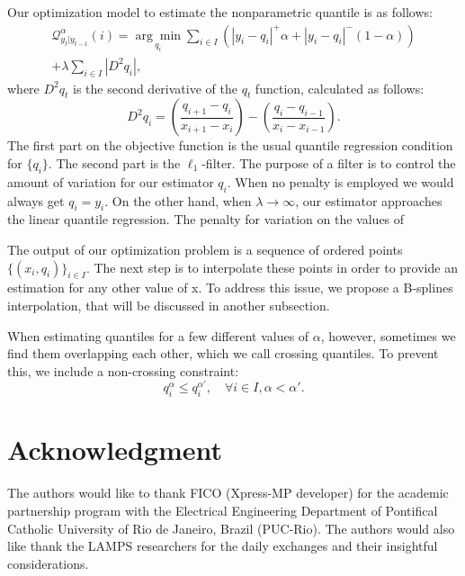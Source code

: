 \documentclass[a4paper]{IEEEtran}
\begin{document}
Our optimization model to estimate the nonparametric quantile is as follows:
\begin{equation}
\begin{split}
\mathcal{Q}_{y_t|y_{t-1}}^\alpha(i) =\underset{q_{i}}{\arg\min}\sum_{i\in I}\left(|y_{i}-q_{i}|^{+}\alpha + |y_{i}-q_{i}|^{-}(1-\alpha)\right) \\ +\lambda  \sum_{i\in I}|D^{2}q_{i}|,
\end{split}
\end{equation}
where $D^2 q_t$ is the second derivative of the $q_t$ function, calculated as follows:
\begin{equation*}
D^{2}q_{i}=\left(\frac{q_{i+1}-q_{i}}{x_{i+1}-x_{i}}\right)-\left(\frac{q_{i}-q_{i-1}}{x_{i}-x_{i-1}}\right).
\end{equation*}
The first part on the objective function is the usual quantile regression condition for $\{q_i\}$. The second part is the $\ell_1$-filter. The purpose of a filter is to control the amount of variation for our estimator $q_i$. When no penalty is employed we would always get $q_i = y_i$. On the other hand, when $\lambda \rightarrow \infty$, our estimator approaches the linear quantile regression.
The penalty for variation on the values of 

The output of our optimization problem is a sequence of ordered points $\{(x_i, q_i)\}_{i \in I}$. The next step is to interpolate these points in order to provide an estimation for any other value of x. To address this issue, we propose a B-splines interpolation, that will be discussed in another subsection.

When estimating quantiles for a few different values of $\alpha$, however, sometimes we find them overlapping each other, which we call crossing quantiles. To prevent this, we include a non-crossing constraint:
\begin{equation}
q_i^{\alpha} \leq q_i^{\alpha'}, \quad \forall i \in I, \alpha < \alpha'.
\end{equation} 


\section*{Acknowledgment}

The authors would like to thank FICO (Xpress-MP developer) for the academic partnership program with the Electrical Engineering Department of Pontifical Catholic University of Rio de Janeiro, Brazil (PUC-Rio). The authors would also like thank the LAMPS researchers for the daily exchanges and their insightful considerations.
\end{document}
